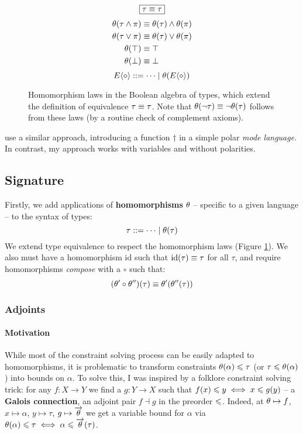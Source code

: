\begin{figure}
    \centering
    $$\boxed{\tau \equiv \tau}$$
    \vspace{-2.5em}
    \begin{align*}
        \theta(\tau \land \pi) &\equiv \theta(\tau) \land \theta(\pi) \\
        \theta(\tau \lor \pi) &\equiv \theta(\tau) \lor \theta(\pi) \\
        \theta(\top) &\equiv \top \\
        \theta(\bot) &\equiv \bot
    \end{align*}
    \vspace{-1.5em}
    $$ \equivctx ::= \cdots \mid \morph(\equivctx) $$
    \caption{Homomorphism laws in the Boolean algebra of types, which extend the definition of equivalence $\tau \equiv \tau$. Note that $\theta(\lnot \tau) \equiv \lnot \theta(\tau)$ follows from these laws (by a routine check of complement axioms).}
    \label{fig:morphism-laws}
\end{figure}

\textcite{oxcaml} use a similar approach, introducing a function $\dagger$ in a simple polar \emph{mode language}. In contrast, my approach works with variables and without polarities.

\subsection{Signature}
\label{subsec:signature-morphisms}

Firstly, we add applications of \textbf{homomorphisms} $\theta$ -- specific to a given language -- to the syntax of types:
$$ \tau ::= \cdots \mid \theta(\tau) $$
We extend type equivalence to respect the homomorphism laws (Figure \ref{fig:morphism-laws}). We also must have a homomorphism $\mathrm{id}$ such that $\mathrm{id}(\tau) \equiv \tau$ for all $\tau$, and require homomorphisms \emph{compose} with a $\circ$ such that: $$\left( \morph' \circ \morph'' \right)(\tau) \equiv \morph'\left( \morph''(\tau) \right)$$

\subsubsection{Adjoints}

\paragraph{Motivation}
While most of the constraint solving process can be easily adapted to homomorphisms, it is problematic to transform constraints $\theta(\alpha) \leqslant \tau$ (or $\tau \leqslant \theta(\alpha)$) into bounds on $\alpha$. 
To solve this, I was inspired by a folklore constraint solving trick: for any $f : X \to Y$ we find a $g : Y \to X$ such that $f(x) \leqslant y \iff x \leqslant g(y)$ -- a \textbf{Galois connection}, \ie{} an adjoint pair $f \dashv g$ in the preorder $\leqslant$. Indeed, at $\theta \mapsto f$, $x \mapsto \alpha$, $y \mapsto \tau$, $g \mapsto \overrightarrow{\theta}$ we get a variable bound for $\alpha$ via $\theta(\alpha) \leqslant \tau \iff \alpha \leqslant \overrightarrow{\theta}(\tau)$.

